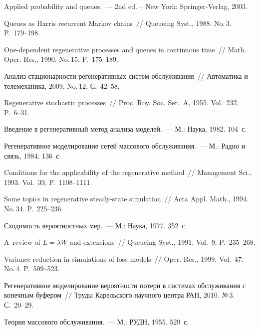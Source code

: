 \begin{multicols}{2}
{{\begin{thebibliography}{99}
 Applied probability and queues.~--- 2nd ed. -- New York: Springer-Verlag, 2003.

 Queues as Harris recurrent Markov chains~//
Queueing Syst., 1988. No.\,3.  P.~179--198.

 One-dependent regenerative processes and
    queues in continuous time~// Math. Oper. Res.,  1990. No.\,15. P.~175--189.

 Анализ
    стационарности регенеративных систем обслуживания~//  Автоматика и
    телемеханика, 2009. No.\,12.  С.~42--58.

 Regenerative stochastic processes~//
    Proc. Roy. Soc.  Ser.~A, 1955. Vol.~232. P.~6--31.


 Введение в регенеративный
    метод анализа моделей.~--- М.: Наука, 1982. 104~с.

 Регенеративное
    моделирование сетей массового обслуживания.~--- М.: Радио и связь, 1984.
    136~с.
    
 Conditions for the
    applicability of the regenerative method~// Management Sci., 1993. Vol.~39. P.~1108--1111.

 Some topics in regenerative
    steady-state simulation~// Acta Appl. Math.,   1994. No.\,34. P.~225--236.

 Сходимость вероятностных мер.~--- М.: Наука, 1977.  352~с.

 A~review of $L=\lambda W$ and extensions~//
    Queueing Syst.,  1991. Vol.~9. P.~235--268.
    
 Variance reduction in
    simulations of loss models~// Oper. Res., 1999. Vol.~47. No.\,4.     P.~509--523.
    
 Регенеративное
    моделирование вероятности потери в системах обслуживания с конечным
    буфером~// Труды Карельского научного центра РАН, 2010. №\,3. С.~20--29.
    
    Теория массового обслуживания.~--- М.: РУДН, 1955. 529~с.


\end{thebibliography}}}
\end{multicols}
